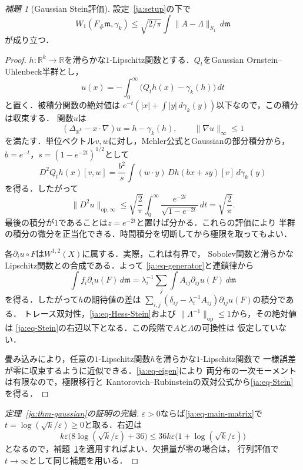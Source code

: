 \documentclass[12pt]{amsart}
\theoremstyle{definition}
\theoremstyle{remark}
\numberwithin{equation}{section}
\newcommand{\R}{\mathbb{R}}
\newcommand{\m}{\mathfrak m}
\theoremstyle{jpplain}
\newtheorem{jlem}[thm]{補題}
\begin{document}
\begin{jlem}[Gaussian Stein評価]\label{ja:lem-Stein}
設定~\ref{ja:setup}の下で
\begin{equation}\label{ja:eq-Stein}
 W_1(F_\#\m,\gamma_k)
 \leq\sqrt{2/\pi}\int\|A-\Lambda\|_{S_1}\,d\m
\end{equation}
が成り立つ．
\end{jlem}
\begin{proof}
$h:\R^k\to\R$を滑らかな$1$-Lipschitz関数とする．$Q_t$をGaussian
Ornstein--Uhlenbeck半群とし，
\[
 u(x)=-\int_0^\infty\bigl(Q_th(x)-\gamma_k(h)\bigr)\,dt
\]
と置く．被積分関数の絶対値は
$e^{-t}(|x|+\int|y|\,d\gamma_k(y))$以下なので，この積分は収束する．
関数$u$は
\[
 (\Delta_{\R^k}-x\cdot\nabla)u=h-\gamma_k(h),\qquad
 \|\nabla u\|_\infty\leq1
\]
を満たす．単位ベクトル$v,w$に対し，Mehler公式とGaussianの部分積分から，
$b=e^{-t}$，$s=(1-e^{-2t})^{1/2}$として
\[
 D^2Q_th(x)[v,w]
 =\frac{b^2}{s}\int(w\cdot y)\,Dh(bx+sy)[v]\,d\gamma_k(y)
\]
を得る．したがって
\begin{equation}\label{ja:eq-Hess-Stein}
 \|D^2u\|_{\mathrm{op},\infty}
 \leq\sqrt{\frac2\pi}
       \int_0^\infty\frac{e^{-2t}}{\sqrt{1-e^{-2t}}}\,dt
 =\sqrt{\frac2\pi}.
\end{equation}
最後の積分が$1$であることは$z=e^{-2t}$と置けば分かる．これらの評価により
半群の積分の微分を正当化できる．時間積分を切断してから極限を取ってもよい．

各$\partial_i u\circ F$は$W^{1,2}(X)$に属する．実際，これは有界で，
Sobolev関数と滑らかなLipschitz関数との合成である．よって
\eqref{ja:eq-generator}と連鎖律から
\begin{equation}\label{ja:eq-IBP-Stein}
 \int f_i\partial_i u(F)\,d\m
 =\lambda_i^{-1}\sum_j\int A_{ij}\partial_{ij}u(F)\,d\m
\end{equation}
を得る．したがって$h$の期待値の差は
$\sum_{i,j}(\delta_{ij}-\lambda_i^{-1}A_{ij})\partial_{ij}u(F)$の積分である．
トレース双対性，\eqref{ja:eq-Hess-Stein}および
$\|\Lambda^{-1}\|_{\mathrm{op}}\leq1$から，その絶対値は
\eqref{ja:eq-Stein}の右辺以下となる．この段階で$A$と$\Lambda$の可換性は
仮定していない．

畳み込みにより，任意の$1$-Lipschitz関数$h$を滑らかな$1$-Lipschitz関数で
一様誤差が零に収束するように近似できる．\eqref{ja:eq-eigen}により
両分布の一次モーメントは有限なので，極限移行と
Kantorovich--Rubinsteinの双対公式から\eqref{ja:eq-Stein}を得る．
\end{proof}

\begin{proof}[定理~\ref{ja:thm-gaussian}の証明の完結]
$\varepsilon>0$ならば\eqref{ja:eq-main-matrix}で
$t=\log(\sqrt{k}/\varepsilon)\geq0$と取る．右辺は
\[
 k\varepsilon\bigl(8\log(\sqrt{k}/\varepsilon)+36\bigr)
 \leq36k\varepsilon\bigl(1+\log(\sqrt{k}/\varepsilon)\bigr)
\]
となるので，補題~\ref{ja:lem-Stein}を適用すればよい．欠損量が零の場合は，
行列評価で$t\to\infty$として同じ補題を用いる．
\end{proof}
\end{document}
